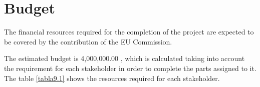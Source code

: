 \section{Budget}

The financial resources required for the completion of the project are expected to be covered by the contribution of the EU Commission.

The estimated budget is 4,000,000.00 \EUR, which is calculated taking into account the requirement for each stakeholder in order to complete the parts assigned to it. The table \ref{tabla9.1} shows the resources required for each stakeholder.

